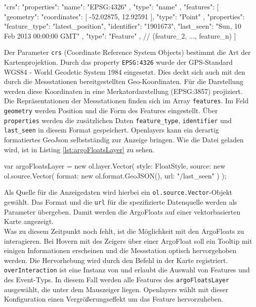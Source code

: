 \begin{javascript}[label={lst:argGeoJson}, caption={Gekürzte geoJSON zur Darstellung der Argo-Floats}]
 {
"crs": {
    "properties": {
      "name": "EPSG:4326"
    }, 
    "type": "name"
  }, 
  "features": [
    {
      "geometry": {
        "coordinates": [
          -52.02875, 
          12.92591
        ], 
        "type": "Point"
      }, 
      "properties": {
        "feature_type": "latest_position", 
        "identifier": "1901673", 
        "last_seen": "Sun, 10 Feb 2013 00:00:00 GMT"
      }, 
      "type": "Feature"
    },
    // (feature_2, ..., feature_n) 
    ]
}
\end{javascript}

Der Parameter \texttt{crs} (Coordinate Reference System Objects) bestimmt die Art der Kartenprojektion. Durch das property \texttt{EPSG:4326} wurde der GPS-Standard WGS84 - World Geodetic System 1984 eingesetzt. Dies deckt sich auch mit den durch die Messstationen bereitgestellten Geo-Koordinaten. Für die Darstellung werden diese Koordinaten in eine Merkatordarstellung (EPSG:3857) projiziert.
\\
Die Repräsentationen der Messstationen finden sich im Array \texttt{features}. Im Feld \texttt{geometry} werden Position und die Form des Features eingestellt. Über \texttt{properties} werden die zusätzlichen Daten \texttt{feature\_type}, \texttt{identifier} und \texttt{last\_seen} in diesem Format gespeichert. 
Openlayers kann ein derartig formatiertes GeoJson selbstständig zur Anzeige bringen. Wie die Datei geladen wird, ist in Listing \ref{lst:argoFloatsLayer} zu sehen.

\begin{javascript}[label={lst:argoFloatsLayer}, caption={Die Funktion argoFloatsLayer}]
var argoFloatsLayer = new ol.layer.Vector({
    style: FloatStyle,
    source: new ol.source.Vector({
        format: new ol.format.GeoJSON(),
        url: "/last_seen"
    })
});
\end{javascript}
Als Quelle für die Anzeigedaten wird hierbei ein \texttt{ol.source.Vector}-Objekt gewählt. Das Format und die \texttt{url} für die spezifizierte Datenquelle werden als Parameter übergeben.
Damit werden die ArgoFloats auf einer vektorbasierten Karte angezeigt.  
\\
Was zu diesem Zeitpunkt noch fehlt, ist die Möglichkeit mit den ArgoFloats zu interagieren. Bei Hovern mit des Zeigers über einer ArgoFloat soll ein Tooltip mit einigen Informationen erscheinen und die Messstation optisch hervorgehoben werden.  Die Hervorhebung wird durch den Befehl  in der Karte registriert. \texttt{overInteraction} ist eine Instanz von  und erlaubt die Auswahl von Features und des Event-Typs. In diesem Fall werden alle Features des \texttt{argoFloatsLayer} ausgewählt, die unter dem Mauszeiger liegen. Openlayers wählt mit dieser Konfiguration einen Vergrößerungseffekt um das Feature hervorzuheben.

